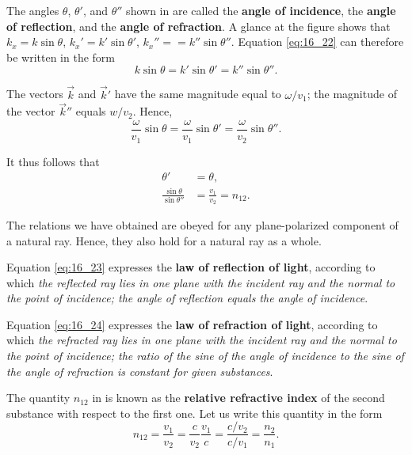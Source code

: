 \noindent
The angles $\theta$, $\theta'$, and $\theta''$ shown in  are called the \textbf{angle of incidence}, the \textbf{angle of reflection}, and the \textbf{angle of refraction}.
A glance at the figure shows that $k_x = k\sin\theta$, $k_x' = k'\sin\theta'$, $k_x'' =
= k''\sin\theta''$.
Equation \eqref{eq:16_22} can therefore be written in the form
\begin{equation*}
    k \sin\theta = k' \sin\theta' = k'' \sin\theta''.
\end{equation*}

\noindent
The vectors $\vec{k}$ and $\vec{k}'$ have the same magnitude equal to $\omega/v_1$; the magnitude of the vector $\vec{k}''$ equals $w/v_2$.
Hence,
\begin{equation*}
    \frac{\omega}{v_1} \sin\theta = \frac{\omega}{v_1} \sin\theta' = \frac{\omega}{v_2} \sin\theta''.
\end{equation*}

\noindent
It thus follows that
\begin{align}
    \theta' &= \theta, \label{eq:16_23}\\
    \frac{\sin\theta}{\sin\theta''} &= \frac{v_1}{v_2} = n_{12}. \label{eq:16_24}
\end{align}

The relations we have obtained are obeyed for any plane-polarized component of a natural ray.
Hence, they also hold for a natural ray as a whole.

Equation \eqref{eq:16_23} expresses the \textbf{law of reflection of light}, according to which \textit{the reflected ray lies in one plane with the incident ray and the normal to the point of incidence; the angle of reflection equals the angle
of incidence}.

Equation \eqref{eq:16_24} expresses the \textbf{law of refraction of light}, according to which \textit{the refracted ray lies in one plane with the incident ray and the normal to the point of incidence; the ratio of the sine of the angle of
incidence to the sine of the angle of refraction is constant for given substances}.

The quantity $n_{12}$ in  is known as the \textbf{relative refractive index} of the second substance with respect to the first one.
Let us write this quantity in the form
\begin{equation}\label{eq:16_25}
    n_{12} = \frac{v_1}{v_2} = \frac{c}{v_2} \frac{v_1}{c} = \frac{c/v_2}{c/v_1} = \frac{n_2}{n_1}.
\end{equation}

